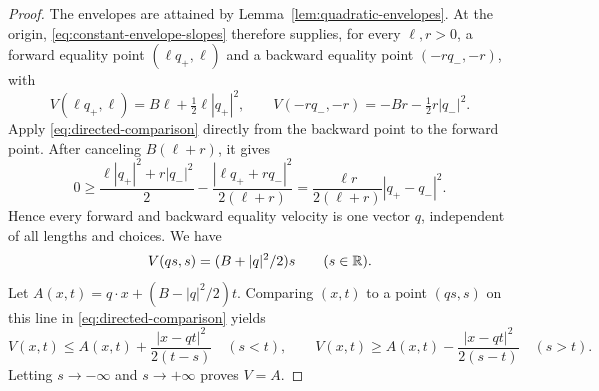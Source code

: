 \begin{proof}
The envelopes are attained by Lemma~\ref{lem:quadratic-envelopes}. At the origin, \eqref{eq:constant-envelope-slopes} therefore supplies, for every $\ell,r>0$, a forward equality point $(\ell q_+,\ell)$ and a backward equality point $(-r q_-,-r)$, with
\[
  V(\ell q_+,\ell)=B\ell+\tfrac12\ell|q_+|^2,
  \qquad V(-r q_-,-r)=-Br-\tfrac12r|q_-|^2.
\]
Apply \eqref{eq:directed-comparison} directly from the backward point to the forward point. After canceling $B(\ell+r)$, it gives
\[
  0\ge \frac{\ell|q_+|^2+r|q_-|^2}{2}
       -\frac{|\ell q_++r q_-|^2}{2(\ell+r)}
    =\frac{\ell r}{2(\ell+r)}|q_+-q_-|^2.
\]
Hence every forward and backward equality velocity is one vector $q$, independent of all lengths and choices. We have
\[
  V(qs,s)=(B+|q|^2/2)s\qquad(s\in\mathbb{R}).
\]
Let $A(x,t)=q\cdot x+(B-|q|^2/2)t$. Comparing $(x,t)$ to a point $(qs,s)$ on this line in \eqref{eq:directed-comparison} yields
\[
  V(x,t)\le A(x,t)+\frac{|x-qt|^2}{2(t-s)}\quad(s<t),
  \qquad
  V(x,t)\ge A(x,t)-\frac{|x-qt|^2}{2(s-t)}\quad(s>t).
\]
Letting $s\to-\infty$ and $s\to+\infty$ proves $V=A$.
\end{proof}

